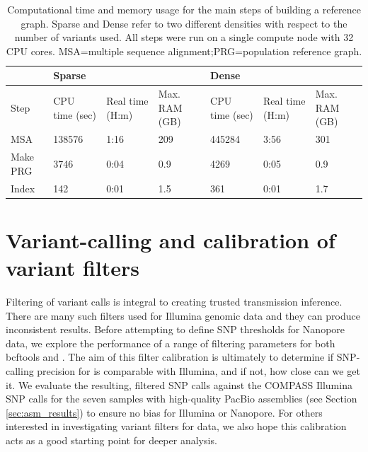 \begin{table}
\centering
\begin{tabularx}{\textwidth}{|l|l|l|l|l|l|l|}
\hline
         & \multicolumn{3}{l|}{Sparse}                          & \multicolumn{3}{l|}{Dense}                           \\ \hline
Step     & CPU time (sec) & Real time (H:m) & Max. RAM (GB) & CPU time (sec) & Real time (H:m) & Max. RAM (GB) \\ \hline%
MSA      & 138576         & 1:16             & 209              & 445284         & 3:56             & 301              \\ \hline%
Make PRG & 3746           & 0:04             & 0.9              & 4269           & 0:05             & 0.9              \\ \hline%
Index    & 142            & 0:01             & 1.5              & 361            & 0:01             & 1.7              \\ \hline%
\end{tabularx}
\caption{Computational time and memory usage for the main steps of building a \mtb{} reference graph. Sparse and Dense refer to two different densities with respect to the number of variants used. All steps were run on a single compute node with 32 CPU cores. MSA=multiple sequence alignment;PRG=population reference graph.}
\label{tab:build-prg}
\end{table}


\section{Variant-calling and calibration of \ont{} variant filters}
\label{sec:var-calls}

Filtering of variant calls is integral to creating trusted transmission
inference. There are many such filters used for Illumina genomic data
and they can produce inconsistent results\cite{walter2020}. Before
attempting to define SNP thresholds for Nanopore data, we explore the
performance of a range of filtering parameters for both bcftools and \pandora{}.  
The aim of this filter calibration is ultimately to determine if SNP-calling precision for \ont{} is comparable with Illumina, and if not, how close can we get it.
We evaluate the resulting, filtered SNP calls
against the COMPASS Illumina SNP calls for the seven
samples with high-quality PacBio assemblies (see Section \autoref{sec:asm_results}) to ensure no bias for
Illumina or Nanopore.
For others interested in investigating variant filters for \ont{} data, we also hope this calibration acts as a good starting point for deeper analysis.

